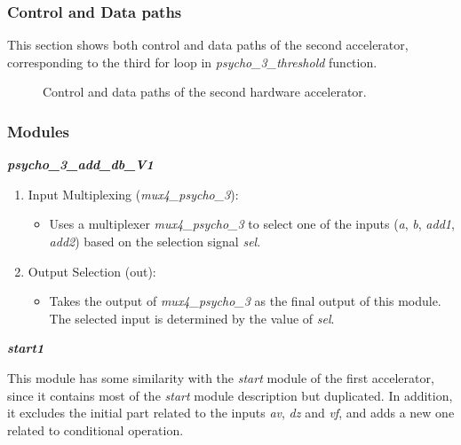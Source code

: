 \subsubsection{Control and Data paths}
This section shows both control and data paths of the second accelerator, corresponding to the third for loop in \textit{psycho\_3\_threshold} function.

\begin{figure}[H]
\centerline{}
\caption{Control and data paths of the second hardware accelerator.}
\label{data2}
\end{figure}

\subsubsection{Modules}

\vspace{0.5cm}

\textbf{\textit{psycho\_3\_add\_db\_V1}}

\begin{enumerate}

\item Input Multiplexing (\textit{mux4\_psycho\_3}):
\begin{itemize}
\item Uses a multiplexer \textit{mux4\_psycho\_3} to select one of the inputs (\textit{a}, \textit{b}, \textit{add1}, \textit{add2}) based on the selection signal \textit{sel}.
\end{itemize}

\item Output Selection (out):
\begin{itemize}
\item Takes the output of \textit{mux4\_psycho\_3} as the final output of this module. The selected input is determined by the value of \textit{sel}.
\end{itemize}

\end{enumerate}

\vspace{0.5cm}

\textbf{\textit{start1}}

This module has some similarity with the \textit{start} module of the first accelerator, since it contains most of the \textit{start} module description but duplicated. In addition, it excludes the initial part related to the inputs \textit{av}, \textit{dz} and \textit{vf}, and adds a new one related to conditional operation. 

